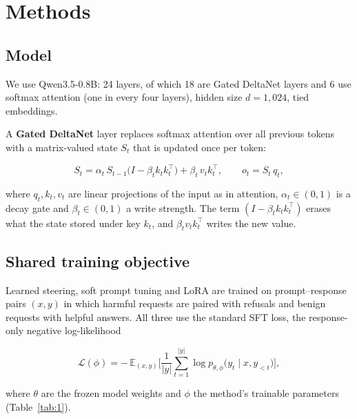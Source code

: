 \documentclass{article}
\begin{document}
\section{Methods}\label{sec:3}

\subsection{Model}\label{sec:3.1}

We use Qwen3.5-0.8B: 24 layers, of which 18 are Gated DeltaNet layers and 6 use softmax attention (one in every four layers), hidden size $d = 1{,}024$, tied embeddings.

A \textbf{Gated DeltaNet} layer \cite{ref17} replaces softmax attention over all previous tokens with a matrix-valued state $S_t$ that is updated once per token:

\begin{equation}
\label{eq:gdn-update}
S_t = \alpha_t\, S_{t-1}\big(I - \beta_t k_t k_t^\top\big) + \beta_t\, v_t k_t^\top, \qquad o_t = S_t\, q_t,
\end{equation}

where $q_t, k_t, v_t$ are linear projections of the input as in attention, $\alpha_t \in (0,1)$ is a decay gate and $\beta_t \in (0,1)$ a write strength. The term $(I - \beta_t k_t k_t^\top)$ erases what the state stored under key $k_t$, and $\beta_t v_t k_t^\top$ writes the new value.

\subsection{Shared training objective}\label{sec:3.2}

Learned steering, soft prompt tuning and LoRA are trained on prompt--response pairs $(x, y)$ in which harmful requests are paired with refusals and benign requests with helpful answers. All three use the standard SFT loss, the response-only negative log-likelihood

\begin{equation}
\label{eq:training-objective}
\mathcal{L}(\phi) = -\,\mathbb{E}_{(x,y)}\Big[\frac{1}{|y|}\sum_{t=1}^{|y|} \log p_{\theta,\phi}\big(y_t \mid x, y_{<t}\big)\Big],
\end{equation}

where $\theta$ are the frozen model weights and $\phi$ the method's trainable parameters (Table~\ref{tab:1}).
\end{document}
